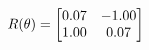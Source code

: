 \documentclass[preview]{standalone}
\begin{document}
\begin{align*}
\special{dvisvgm:raw <g id='unique000'>}R(\theta) = \begin{bmatrix}0.07 & -1.00\\1.00 & 0.07\end{bmatrix}\special{dvisvgm:raw </g>}
\end{align*}
\end{document}
